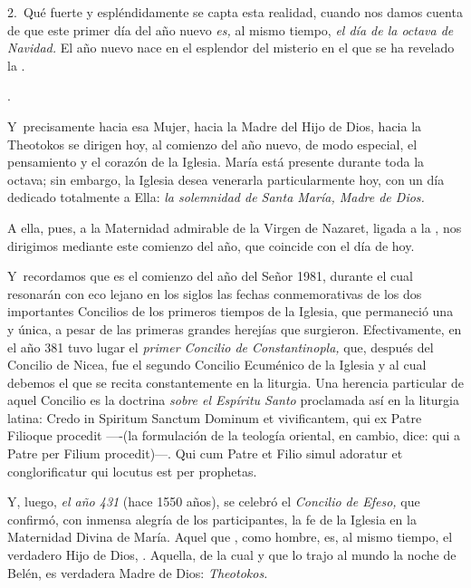 2.~Qué fuerte y espléndidamente se capta esta realidad, cuando nos damos cuenta de que este primer día del año nuevo \emph{es,} al mismo tiempo, \emph{el día de la octava de Navidad.} El año nuevo nace en el esplendor del misterio en el que se ha revelado la .

.

Y~precisamente hacia esa Mujer, hacia la Madre del Hijo de Dios, hacia la Theotokos se dirigen hoy, al comienzo del año nuevo, de modo especial, el pensamiento y el corazón de la Iglesia. María está presente durante toda la octava; sin embargo, la Iglesia desea venerarla particularmente hoy, con un día dedicado totalmente a Ella: \emph{la solemnidad de Santa María, Madre de Dios.}

A ella, pues, a la Maternidad admirable de la Virgen de Nazaret, ligada a la , nos dirigimos mediante este comienzo del año, que coincide con el día de hoy.

Y~recordamos que es el comienzo del año del Señor 1981, durante el cual resonarán con eco lejano en los siglos las fechas conmemorativas de los dos importantes Concilios de los primeros tiempos de la Iglesia, que permaneció una y única, a pesar de las primeras grandes herejías que surgieron. Efectivamente, en el año 381 tuvo lugar el \emph{primer Concilio de Constantinopla,} que, después del Concilio de Nicea, fue el segundo Concilio Ecuménico de la Iglesia y al cual debemos el  que se recita constantemente en la liturgia. Una herencia particular de aquel Concilio es la doctrina \emph{sobre el Espíritu Santo} proclamada así en la liturgia latina: Credo in Spiritum Sanctum Dominum et vivificantem, qui ex Patre Filioque procedit ----(la formulación de la teología oriental, en cambio, dice: qui a Patre per Filium procedit)---. Qui cum Patre et Filio simul adoratur et conglorificatur qui locutus est per prophetas.

Y, luego, \emph{el año 431} (hace 1550 años), se celebró el \emph{Concilio de Efeso,} que confirmó, con inmensa alegría de los participantes, la fe de la Iglesia en la Maternidad Divina de María. Aquel que , como hombre, es, al mismo tiempo, el verdadero Hijo de Dios, . Aquella, de la cual  y que lo trajo al mundo la noche de Belén, es verdadera Madre de Dios: \emph{Theotokos.}

